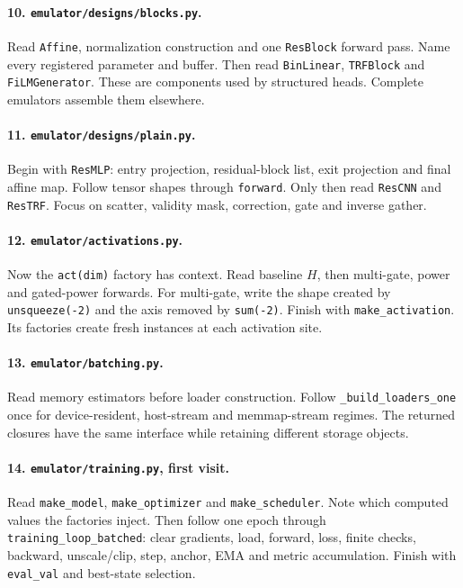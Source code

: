 \documentclass[10pt,aps,prd,twocolumn,nofootinbib]{revtex4-2}
\newcommand{\code}[1]{\texttt{#1}}
\begin{document}
\paragraph{10.  \code{emulator/designs/blocks.py}.}
Read \code{Affine}, normalization construction and one \code{ResBlock}
forward pass.  Name every registered parameter and buffer.  Then read
\code{BinLinear}, \code{TRFBlock} and \code{FiLMGenerator}.  These are
components used by structured heads.  Complete emulators assemble them
elsewhere.

\paragraph{11.  \code{emulator/designs/plain.py}.}
Begin with \code{ResMLP}: entry projection, residual-block list, exit
projection and final affine map.  Follow tensor shapes through
\code{forward}.  Only then read \code{ResCNN} and \code{ResTRF}.  Focus on
scatter, validity mask, correction, gate and inverse gather.

\paragraph{12.  \code{emulator/activations.py}.}
Now the \code{act(dim)} factory has context.  Read baseline \(H\), then
multi-gate, power and gated-power forwards.  For multi-gate, write the shape
created by \code{unsqueeze(-2)} and the axis removed by \code{sum(-2)}.
Finish with \code{make\_activation}.  Its factories create fresh instances at
each activation site.

\paragraph{13.  \code{emulator/batching.py}.}
Read memory estimators before loader construction.  Follow
\code{\_build\_loaders\_one} once for device-resident, host-stream and
memmap-stream regimes.  The returned closures have the same interface while
retaining different storage objects.

\paragraph{14.  \code{emulator/training.py}, first visit.}
Read \code{make\_model}, \code{make\_optimizer} and
\code{make\_scheduler}.  Note which computed values the factories inject.
Then follow one epoch through \code{training\_loop\_batched}: clear gradients,
load, forward, loss, finite checks, backward, unscale/clip, step, anchor, EMA
and metric accumulation.  Finish with \code{eval\_val} and best-state
selection.
\end{document}
